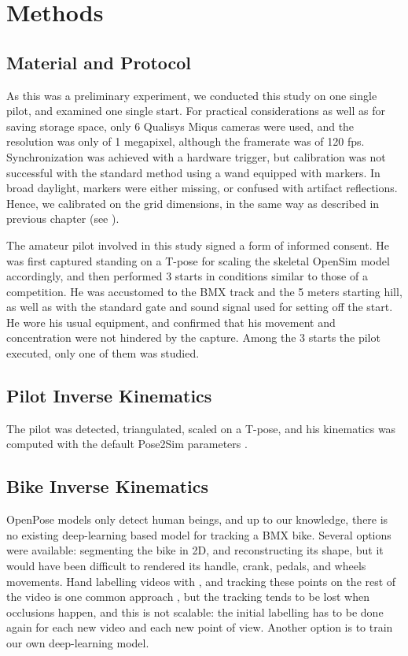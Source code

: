 \section{Methods}

\subsection{Material and Protocol}
As this was a preliminary experiment, we conducted this study on one single pilot, and examined one single start. For practical considerations as well as for saving storage space, only 6 Qualisys Miqus cameras were used, and the resolution was only of 1 megapixel, although the framerate was of 120 fps. Synchronization was achieved with a hardware trigger, but calibration was not successful with the standard method using a wand equipped with markers. In broad daylight, markers were either missing, or confused with artifact reflections. Hence, we calibrated on the grid dimensions, in the same way as described in previous chapter (see ). 

The amateur pilot involved in this study signed a form of informed consent. He was first captured standing on a T-pose for scaling the skeletal OpenSim model accordingly, and then performed 3 starts in conditions similar to those of a competition. He was accustomed to the BMX track and the 5 meters starting hill, as well as with the standard gate and sound signal used for setting off the start. He wore his usual equipment, and confirmed that his movement and concentration were not hindered by the capture. Among the 3 starts the pilot executed, only one of them was studied. 


\subsection{Pilot Inverse Kinematics}
The pilot was detected, triangulated, scaled on a T-pose, and his kinematics was computed with the default Pose2Sim parameters \cite{Pagnon2022b}. 


\subsection{Bike Inverse Kinematics}
OpenPose models only detect human beings, and up to our knowledge, there is no existing deep-learning based model for tracking a BMX bike. Several options were available: segmenting the bike in 2D, and reconstructing its shape, but it would have been difficult to rendered its handle, crank, pedals, and wheels movements. Hand labelling videos with \cite{Kinovea}, and tracking these points on the rest of the video is one common approach \cite{Grigg2018}, but the tracking tends to be lost when occlusions happen, and this is not scalable: the initial labelling has to be done again for each new video and each new point of view. Another option is to train our own deep-learning model.

